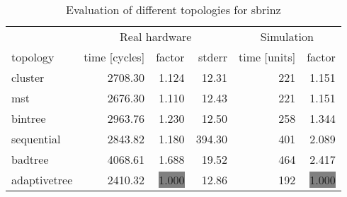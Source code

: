 \begin{table}[htb]
  \centering
  \begin{tabular}{lrrrrr}
  \toprule
  & \multicolumn{3}{c}{Real hardware} & \multicolumn{2}{c}{Simulation} \\
  topology & time [cycles] & factor & stderr & time [units] & factor \\
  \midrule
  cluster & 2708.30 & 1.124 & 12.31 & 221 & 1.151 \\
  mst & 2676.30 & 1.110 & 12.43 & 221 & 1.151 \\
  bintree & 2963.76 & 1.230 & 12.50 & 258 & 1.344 \\
  sequential & 2843.82 & 1.180 & 394.30 & 401 & 2.089 \\
  badtree & 4068.61 & 1.688 & 19.52 & 464 & 2.417 \\
  adaptivetree & 2410.32 & \colorbox{gray}{1.000} & 12.86 & 192 & \colorbox{gray}{1.000} \\
  \midrule
  \end{tabular}
  \caption{Evaluation of different topologies for sbrinz}
  \label{tab:sbrinz}
\end{table}
